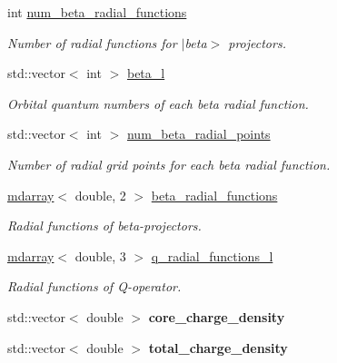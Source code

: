 \begin{DoxyCompactItemize}
int \hyperlink{structpseudopotential__descriptor_a742d7a1e24c47a67de4c39872fdc42da}{num\+\_\+beta\+\_\+radial\+\_\+functions}
\begin{DoxyCompactList}\small\item\em Number of radial functions for $\vert$beta$>$ projectors. \end{DoxyCompactList}\item 
std\+::vector$<$ int $>$ \hyperlink{structpseudopotential__descriptor_ae86b630c65e7b9633d0162d3e1448190}{beta\+\_\+l}
\begin{DoxyCompactList}\small\item\em Orbital quantum numbers of each beta radial function. \end{DoxyCompactList}\item 
std\+::vector$<$ int $>$ \hyperlink{structpseudopotential__descriptor_abb989ec455c493c88f4d115afba25afd}{num\+\_\+beta\+\_\+radial\+\_\+points}
\begin{DoxyCompactList}\small\item\em Number of radial grid points for each beta radial function. \end{DoxyCompactList}\item 
\hyperlink{classsddk_1_1mdarray}{mdarray}$<$ double, 2 $>$ \hyperlink{structpseudopotential__descriptor_adc359985f0583a7ac7a118cea93a9b30}{beta\+\_\+radial\+\_\+functions}
\begin{DoxyCompactList}\small\item\em Radial functions of beta-\/projectors. \end{DoxyCompactList}\item 
\hyperlink{classsddk_1_1mdarray}{mdarray}$<$ double, 3 $>$ \hyperlink{structpseudopotential__descriptor_aba718fec7abb8fd022c1dde98b0b7fee}{q\+\_\+radial\+\_\+functions\+\_\+l}
\begin{DoxyCompactList}\small\item\em Radial functions of Q-\/operator. \end{DoxyCompactList}\item 
\hypertarget{structpseudopotential__descriptor_a5fe9db7b79ac829676c24928f522d708}{}std\+::vector$<$ double $>$ {\bfseries core\+\_\+charge\+\_\+density}\label{structpseudopotential__descriptor_a5fe9db7b79ac829676c24928f522d708}

\item 
\hypertarget{structpseudopotential__descriptor_a69319c80261834800258be0f50e5fccd}{}std\+::vector$<$ double $>$ {\bfseries total\+\_\+charge\+\_\+density}\label{structpseudopotential__descriptor_a69319c80261834800258be0f50e5fccd}


\end{DoxyCompactItemize}
